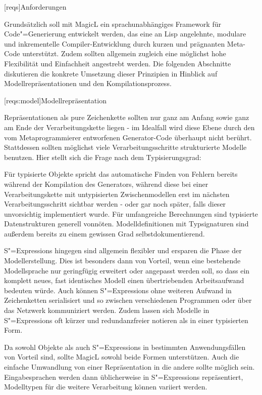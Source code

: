 \documentclass[11pt, a4paper, bibgerm]{book}
\newcommand\lchapter{}
\newcommand\lsection{}
\newcommand{\sexps}{S"=Expressions}
\newcommand{\cgen}{Code"=Generierung}
\begin{document}
\lchapter[reqs]{Anforderungen}

Grundsätzlich soll mit MagicL ein sprachunabhängiges Framework für
\cgen{} entwickelt werden, das eine an Lisp angelehnte, modulare und
inkrementelle Compiler-Entwicklung durch kurzen und prägnanten Meta-Code
unterstützt. Zudem sollten allgemein zugleich eine möglichst hohe
Flexibilität und Einfachheit angestrebt werden. Die folgenden Abschnitte
diskutieren die konkrete Umsetzung dieser Prinzipien in Hinblick auf
Modellrepräsentationen und den Kompilationsprozess.

\lsection[reqs:model]{Modellrepräsentation}

Repräsentationen als pure Zeichenkette sollten nur ganz am Anfang sowie
ganz am Ende der Verarbeitungskette liegen - im Idealfall wird diese
Ebene durch den vom Metaprogrammierer entworfenen Generator-Code
überhaupt nicht berührt. Stattdessen sollten möglichst viele
Verarbeitungsschritte strukturierte Modelle benutzen. Hier stellt
sich die Frage nach dem Typisierungsgrad:

Für typisierte Objekte spricht das automatische Finden von Fehlern
bereits während der Kompilation des Generators, während diese bei einer
Verarbeitungskette mit untypisierten Zwischenmodellen erst im nächsten
Verarbeitungsschritt sichtbar werden - oder gar noch später, falls
dieser unvorsichtig implementiert wurde. Für umfangreiche Berechnungen
sind typisierte Datenstrukturen generell vonnöten. Modelldefinitionen
mit Typsignaturen sind außerdem bereits zu einem gewissen Grad
selbstdokumentierend.

\sexps{} hingegen sind allgemein flexibler und ersparen die Phase der
Modellerstellung. Dies ist besonders dann von Vorteil, wenn eine
bestehende Modellsprache nur geringfügig erweitert oder angepasst werden
soll, so dass ein komplett neues, fast identisches Modell einen
übertriebenden Arbeitsaufwand bedeuten würde. Auch können \sexps{} ohne
weiteren Aufwand in Zeichenketten serialisiert und so zwischen
verschiedenen Programmen oder über das Netzwerk kommuniziert
werden. Zudem lassen sich Modelle in \sexps{} oft kürzer und
redundanzfreier notieren als in einer typisierten Form.

Da sowohl Objekte als auch \sexps{} in bestimmten Anwendungsfällen von
Vorteil sind, sollte MagicL sowohl beide Formen unterstützen. Auch die
einfache Umwandlung von einer Repräsentation in die andere sollte
möglich sein. Eingabesprachen werden dann üblicherweise in \sexps{}
repräsentiert, Modelltypen für die weitere Verarbeitung können variiert
werden.
\end{document}
